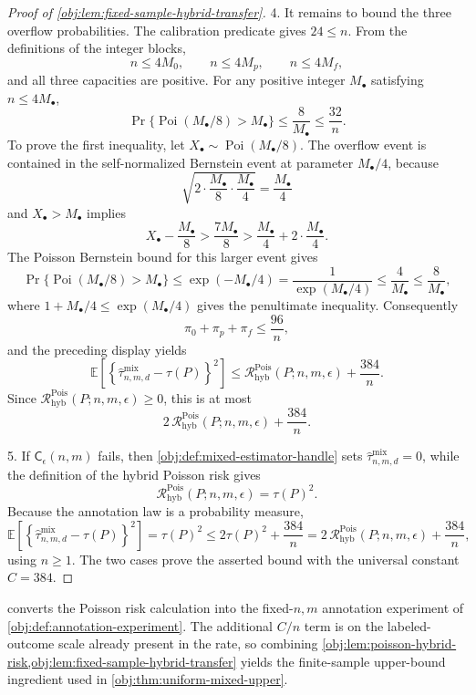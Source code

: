 \documentclass[11pt]{article}
\begin{document}
\begin{proof}[Proof of \cref{obj:lem:fixed-sample-hybrid-transfer}]
4. It remains to bound the three overflow probabilities.  The calibration predicate gives \(24\le n\).  From the definitions of the integer blocks,
\[
n\le4M_0,\qquad n\le4M_p,\qquad n\le4M_f,
\]
and all three capacities are positive.  For any positive integer \(M_\bullet\) satisfying \(n\le4M_\bullet\),
\[
\Pr\{\operatorname{Poi}(M_\bullet/8)>M_\bullet\}
\le
\frac{8}{M_\bullet}
\le
\frac{32}{n}.
\]
To prove the first inequality, let \(X_\bullet\sim\operatorname{Poi}(M_\bullet/8)\).  The overflow event is contained in the self-normalized Bernstein event at parameter \(M_\bullet/4\), because
\[
\sqrt{2\cdot\frac{M_\bullet}{8}\cdot\frac{M_\bullet}{4}}
=\frac{M_\bullet}{4}
\]
and \(X_\bullet>M_\bullet\) implies
\[
X_\bullet-\frac{M_\bullet}{8}
>\frac{7M_\bullet}{8}
>\frac{M_\bullet}{4}+2\cdot\frac{M_\bullet}{4}.
\]
The Poisson Bernstein bound for this larger event gives
\[
\Pr\{\operatorname{Poi}(M_\bullet/8)>M_\bullet\}
\le
\exp(-M_\bullet/4)
=
\frac1{\exp(M_\bullet/4)}
\le
\frac{4}{M_\bullet}
\le
\frac{8}{M_\bullet},
\]
where \(1+M_\bullet/4\le \exp(M_\bullet/4)\) gives the penultimate inequality.
Consequently
\[
\pi_0+\pi_p+\pi_f\le \frac{96}{n},
\]
and the preceding display yields
\[
\mathbb E\!\left[
\left\{\widehat\tau^{\mathrm{mix}}_{n,m,d}-\tau(P)\right\}^2
\right]
\le
\mathcal R^{\mathrm{Pois}}_{\mathrm{hyb}}(P;n,m,\epsilon)
+\frac{384}{n}.
\]
Since \(\mathcal R^{\mathrm{Pois}}_{\mathrm{hyb}}(P;n,m,\epsilon)\ge0\), this is at most
\[
2\,\mathcal R^{\mathrm{Pois}}_{\mathrm{hyb}}(P;n,m,\epsilon)
+\frac{384}{n}.
\]

5. If \(\mathsf C_\epsilon(n,m)\) fails, then \cref{obj:def:mixed-estimator-handle} sets
\(\widehat\tau^{\mathrm{mix}}_{n,m,d}=0\), while the definition of the hybrid Poisson risk gives
\[
\mathcal R^{\mathrm{Pois}}_{\mathrm{hyb}}(P;n,m,\epsilon)=\tau(P)^2.
\]
Because the annotation law is a probability measure,
\[
\mathbb E\!\left[
\left\{\widehat\tau^{\mathrm{mix}}_{n,m,d}-\tau(P)\right\}^2
\right]
=
\tau(P)^2
\le
2\tau(P)^2+\frac{384}{n}
=
2\,\mathcal R^{\mathrm{Pois}}_{\mathrm{hyb}}(P;n,m,\epsilon)+\frac{384}{n},
\]
using \(n\ge1\).  The two cases prove the asserted bound with the universal constant \(C=384\). %
\end{proof}

 converts the Poisson risk calculation into the fixed-\(n,m\) annotation experiment of \cref{obj:def:annotation-experiment}. The additional \(C/n\) term is on the labeled-outcome scale already present in the rate, so combining \cref{obj:lem:poisson-hybrid-risk,obj:lem:fixed-sample-hybrid-transfer} yields the finite-sample upper-bound ingredient used in \cref{obj:thm:uniform-mixed-upper}.
\end{document}
